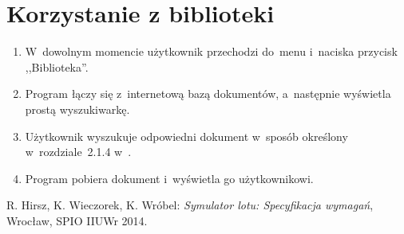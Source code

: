 \documentclass{mwrep}
\begin{document}
\section{Korzystanie z biblioteki}
\begin{enumerate}
  \item W~dowolnym momencie użytkownik przechodzi do~menu i~naciska przycisk ,,Biblioteka''.
  \item Program łączy się z~internetową bazą dokumentów, a~następnie wyświetla prostą wyszukiwarkę.
  \item Użytkownik wyszukuje odpowiedni dokument w~sposób określony w~rozdziale~2.1.4 w~\cite{WYM}.
  \item Program pobiera dokument i~wyświetla go użytkownikowi.
\end{enumerate}

\begin{thebibliography}{9}
   R. Hirsz, K. Wieczorek, K. Wróbel: \textit{Symulator lotu: Specyfikacja wymagań}, Wrocław, SPIO IIUWr 2014.
\end{thebibliography}
\end{document}
